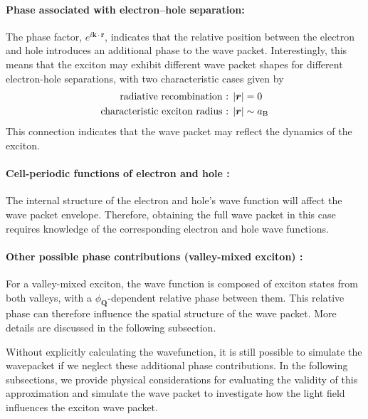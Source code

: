 \paragraph*{Phase associated with electron--hole separation: }
The phase factor, $e^{i\boldsymbol{k}\cdot\boldsymbol{r}}$, indicates that the relative position between the electron and hole introduces an additional phase to the wave packet. Interestingly, this means that the exciton may exhibit different wave packet shapes for different electron-hole separations, with two characteristic cases given by
\begin{equation}
\vspace{-0.3em}
\begin{aligned}
\text{radiative recombination : } & |\boldsymbol{r}| = 0 \\
\text{characteristic exciton radius : } & |\boldsymbol{r}| \sim a_{\text{B}}
\end{aligned}
\vspace{-0.3em}
\end{equation}
This connection indicates that the wave packet may reflect the dynamics of the exciton.
\vspace{-1em}
\paragraph*{Cell-periodic functions of electron and hole : }
The internal structure of the electron and hole's wave function will affect the wave packet envelope. Therefore, obtaining the full wave packet in this case requires knowledge of the corresponding electron and hole wave functions.
\vspace{-1em}
\paragraph*{Other possible phase contributions (valley-mixed exciton) : }
For a valley-mixed exciton, the wave function is composed of exciton states from both valleys, with a $\phi_{\boldsymbol{Q}}$-dependent relative phase between them. This relative phase can therefore influence the spatial structure of the wave packet. More details are discussed in the following subsection.

Without explicitly calculating the wavefunction, it is still possible to simulate the wavepacket if we neglect these additional phase contributions. In the following subsections, we provide physical considerations for evaluating the validity of this approximation and simulate the wave packet to investigate how the light field influences the exciton wave packet.


